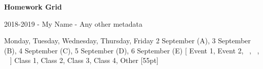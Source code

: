 \documentclass{hwgrid}
\begin{document}
{\Large\bfseries Homework Grid}

\vspace{0.25cm}

{\large 2018-2019 - My Name - Any other metadata}

\insertgrid
 {Monday, Tuesday, Wednesday, Thursday, Friday}
 {
   2 September (A),
   3 September (B),
   4 September (C),
   5 September (D),
   6 September (E)
 }
 [
   Event 1,
   Event 2,
   ~,
   ~,
   ~
 ]
 {
   Class 1,
   Class 2,
   Class 3,
   Class 4,
   Other
 }
 [55pt]
\end{document}
